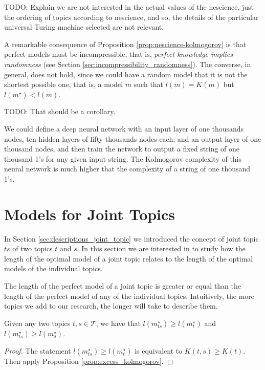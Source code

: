 {\color{red} TODO: Explain we are not interested in the actual values of the nescience, just the ordering of topics according to nescience, and so, the details of the particular universal Turing machine selected are not relevant.}

A remarkable consequence of Proposition \ref{prop:nescience-kolmogorov} is that perfect models must be incompressible, that is, \emph{perfect knowledge implies randomness} (see Section \ref{sec:incompressibility_randomness}). The converse, in general, does not hold, since we could have a random model that it is not the shortest possible one, that is, a model $m$ such that $l(m) = K(m)$ but $l(m^{\star}) < l(m)$.

{\color{red} TODO: That should be a corollary.}

\begin{example}
\label{ex:description_neural}
We could define a deep neural network with an input layer of one thousands nodes, ten hidden layers of fifty thousands nodes each, and an output layer of one thousand nodes, and then train the network to output a fixed string of one thousand 1's for any given input string. The Kolmogorov complexity of this neural network is much higher that the complexity of a string of one thousand 1's.
\end{example}

%
%

\section{Models for Joint Topics}
\label{sec:descriptions_joint_model}

In Section \ref{sec:descriptions_joint_topic} we introduced the concept of joint topic $ts$ of two topics $t$ and $s$. In this section we are interested in to study how the length of the optimal model of a joint topic relates to the length of the optimal models of the individual topics.

The length of the perfect model of a joint topic is greater or equal than the length of the perfect model of any of the individual topics. Intuitively, the more topics we add to our research, the longer will take to describe them.

\begin{proposition}
\label{prop:joint_length}
Given any two topics $t,s \in \mathcal{T}$, we have that $l \left( m_{ts}^{\star} \right) \geq l \left( m_{t}^{\star} \right)$ and $l \left( m_{ts}^{\star} \right) \geq l \left( m_{s}^{\star} \right)$.
\end{proposition}
\begin{proof}
The statement $l \left( m_{ts}^{\star} \right) \geq l \left( m_{t}^{\star} \right)$ is equivalent to $K(t,s) \geq K(t)$. Then apply Proposition \ref{prop:excess_kolmogorov}.
\end{proof}

